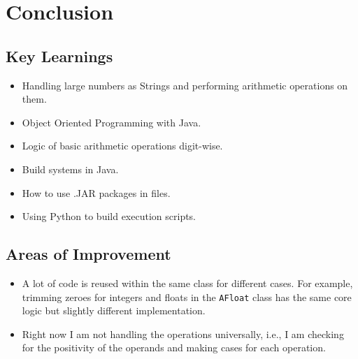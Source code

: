 \documentclass[15pt]{article}
\begin{document}
\section{Conclusion}

\subsection{Key Learnings}

\begin{itemize}
    \item Handling large numbers as Strings and performing arithmetic operations on them.
    \item Object Oriented Programming with Java.
    \item Logic of basic arithmetic operations digit-wise.
    \item Build systems in Java.
    \item How to use .JAR packages in files.
    \item Using Python to build execution scripts.
\end{itemize}

\subsection{Areas of Improvement}

\begin{itemize}
    \item A lot of code is reused within the same class for different cases. For example, trimming zeroes for integers and floats in the \texttt{AFloat} class has the same core logic but slightly different implementation.
    \item Right now I am not handling the operations universally, i.e., I am checking for the positivity of the operands and making cases for each operation.
\end{itemize}
\end{document}

